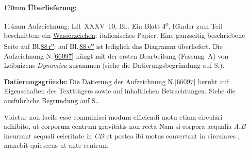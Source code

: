 %
\frenchspacing%
\begin{ledgroupsized}[r]{120mm}%
\footnotesize%
\pstart%
\noindent\textbf{Überlieferung:}%
\pend%
\end{ledgroupsized}%
\begin{ledgroupsized}[r]{114mm}%
\footnotesize%
\pstart%
\parindent -6mm%
%
Aufzeichnung:
LH~XXXV~10, Bl..
Ein Blatt 4\textsuperscript{o},
Ränder zum Teil beschnitten;
ein \href{\Scan{LH_35_10_11_088wz}}{Wasserzeichen}:
italienisches Papier.
Eine ganzseitig beschriebene Seite auf Bl.\;\href{\Scan{LH_35_10_11_088r}}{88\,r\textsuperscript{o}};
auf Bl.\,\href{\Scan{LH_35_10_11_088v}}{88\,v\textsuperscript{o}} ist lediglich das Diagramm  überliefert.
Die Aufzeichnung N.\ref{66097} hängt mit der ersten Bearbeitung (Fassung~A) von Leibnizens \textit{Dynamica}\cite{01354} zusammen (siehe die Datierungsbegründung auf S.\;\pageref{66097_dat}).
\pend%
\end{ledgroupsized}%
\vspace{5mm}%
\begin{ledgroup}%
\footnotesize%
\pstart%
\noindent%
\textbf{Datierungsgründe:}
Die Datierung der Aufzeichnung N.\;\ref{66097} beruht auf Eigenschaften des Textträgers sowie 
auf inhaltlichen Betrachtungen.
Siehe die ausführliche Begründung auf S.\;\pageref{66097_dat}.%
\pend%
\end{ledgroup}%
%
\frenchspacing%
\vspace{8mm}%
\normalsize%
\pstart%
\noindent%
%
Videtur
non facile esse
comminisci modum efficiendi%
%
\bracks{,}
motu etiam circulari adhibito,%
ut corporum centrum gravitatis%
non recta
Nam si corpora aequalia \textit{A},\:\textit{B}%
incurrant aequali celeritate in \textit{CD}%
et postea ibi motus convertant in circulares%
, %
manebit quiescens ut ante centrum%
